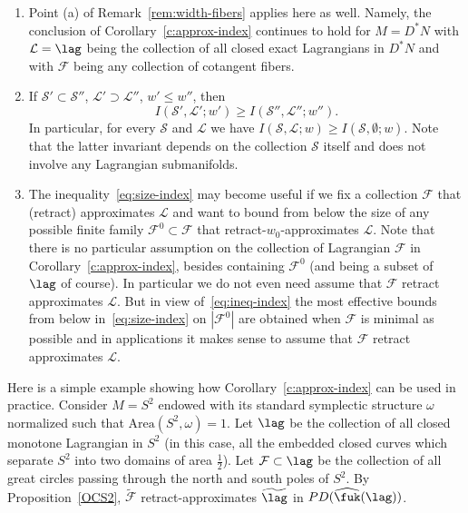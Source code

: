 \begin{rems} \label{r:approx-index}
  \begin{enumerate}
  \item Point (a) of Remark~\ref{rem:width-fibers} applies here as well.
    Namely, the conclusion of Corollary~\ref{c:approx-index} continues
    to hold for $M = D^*N$ with $\mathcal{L} = \lag$ being the
    collection of all closed exact Lagrangians in $D^*N$ and with
    $\mathcal{F}$ being any collection of cotangent fibers.
  \item If $\mathcal{S}' \subset \mathcal{S}''$,
    $\mathcal{L}' \supset \mathcal{L}''$, $w' \leq w''$, then
    \begin{equation} \label{eq:ineq-index} I(\mathcal{S}', \mathcal{L}';
      w') \geq I(\mathcal{S}'', \mathcal{L}'';w'').
    \end{equation}
    In particular, for every $\mathcal{S}$ and $\mathcal{L}$ we have
    $I(\mathcal{S}, \mathcal{L}; w) \geq I(\mathcal{S}, \emptyset;
    w)$. Note that the latter invariant depends on the collection
    $\mathcal{S}$ itself and does not involve any Lagrangian
    submanifolds.
  \item The inequality~\eqref{eq:size-index} may become useful if we
    fix a collection $\mathcal{F}$ that (retract) approximates
    $\mathcal{L}$ and want to bound from below the size of any
    possible finite family $\mathcal{F}^0 \subset \mathcal{F}$ that
    retract-$w_0$-approximates $\mathcal{L}$. Note that there is
    no particular assumption on the collection of Lagrangian $\mathcal{F}$
    in Corollary~\ref{c:approx-index}, besides containing
    $\mathcal{F}^0$ (and being a subset of $\lag$ of course). In
    particular we do not even need assume that $\mathcal{F}$ retract
    approximates $\mathcal{L}$. But in view of~\eqref{eq:ineq-index}
    the most effective bounds from below in~\eqref{eq:size-index} on
    $|\mathcal{F}^0|$ are obtained when $\mathcal{F}$ is minimal as
    possible and in applications it makes sense to assume that
    $\mathcal{F}$ retract approximates $\mathcal{L}$.
  \end{enumerate}
\end{rems}

Here is a simple example showing how Corollary~\ref{c:approx-index}
can be used in practice. Consider $M=S^2$ endowed with its standard
symplectic structure $\omega$ normalized such that
$\text{Area}(S^2, \omega) = 1$. Let $\lag$ be the collection of all
closed monotone Lagrangian in $S^2$ (in this case, all the embedded
closed curves which separate $S^2$ into two domains of area
$\tfrac{1}{2}$). Let $\mathcal{F} \subset \lag$ be the collection of
all great circles passing through the north and south poles of $S^2$.
By Proposition~\ref{OCS2}, $\widetilde{\mathcal{F}}$
retract-approximates $\widetilde{\lag}$ in $PD(\widehat{\fuk}(\lag))$.

